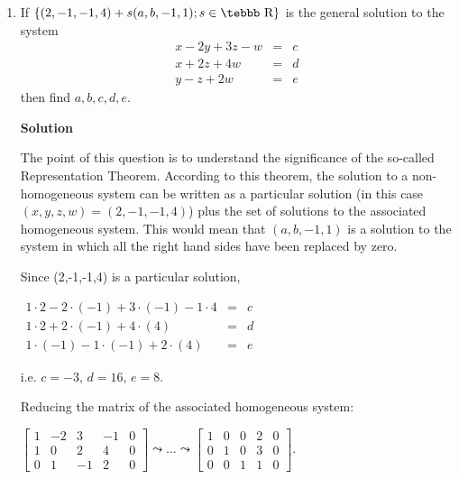 \begin{enumerate}
\begin{align*}
\begin{array}{rrr}
36 & -20 \\ -20 & -20 & 20 \end{array} \right] \left[
\begin{array}{rrrr} 1 & 1 & 1 & 1 \\ -1 & 0 & 1 & 2 \\ 1 & 0 & 1
& 4 \end{array}\right]
\left[ \begin{array}{r} -0.9 \\ -1.1 \\ 0.8 \\ 5.2 \end{array} \right]\\
&= \left[ \begin{array}{r} -1.16 \\ 0.87 \\ 1.15 \end{array}
\right].
\end{align*}
\item If $\{(2,-1,-1,4)+s(a,b,-1,1);s\in \mbox{\tebbb R}\}$ is the
general solution to the system
$$\begin{array}{rcl}x-2y+3z-w&=&c\\x+2z+4w&=&d\\y-z+2w&=&e\end{array}$$
then find $a,b,c,d,e$.

\noindent \textbf{Solution}

The point of this question is to
understand the significance of the so-called Representation
Theorem. According to this theorem, the solution to a
non-homogeneous system can be written as a particular solution (in
this case $(x,y,z,w)=(2,-1,-1,4)$) plus the set of solutions to the
associated homogeneous system. This would mean that $(a,b,-1,1)$
is a solution to the system in which all the right hand sides have
been replaced by zero.

Since (2,-1,-1,4) is a particular solution,

$\begin{array}{rcl}1\cdot 2-2\cdot (-1)+3\cdot (-1)-1\cdot4&=&c\\
1\cdot 2+2\cdot (-1)+4\cdot (4)&=&d\\
1\cdot (-1)-1\cdot (-1)+2\cdot (4)&=&e\end{array}$

i.e. $c=-3,\,d=16,\,e=8.$

Reducing the matrix of the associated homogeneous system:

$\left[\begin{array}{rrrr|r}1&-2&3&-1&0\\1&0&2&4&0\\0&1&-1&2&0\end{array}\right]\leadsto\ldots\leadsto
\left[\begin{array}{rrrr|r}1&0&0&2&0\\0&1&0&3&0\\0&0&1&1&0\end{array}\right].$


\end{enumerate}
